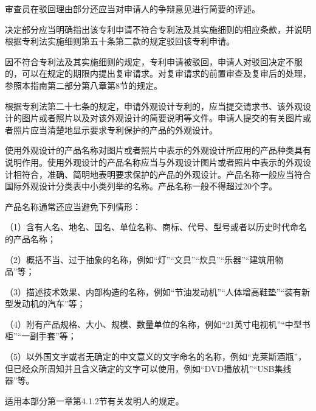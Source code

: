 审查员在驳回理由部分还应当对申请人的争辩意见进行简要的评述。

决定部分应当明确指出该专利申请不符合专利法及其实施细则的相应条款，并说明根据专利法实施细则第五十条第二款的规定驳回该专利申请。

因不符合专利法及其实施细则的规定，专利申请被驳回，申请人对驳回决定不服的，可以在规定的期限内提出复审请求。对复审请求的前置审查及复审后的处理，参照本指南第二部分第八章第8节的规定。

根据专利法第二十七条的规定，申请外观设计专利的，应当提交请求书、该外观设计的图片或者照片以及对该外观设计的简要说明等文件。申请人提交的有关图片或者照片应当清楚地显示要求专利保护的产品的外观设计。

使用外观设计的产品名称对图片或者照片中表示的外观设计所应用的产品种类具有说明作用。使用外观设计的产品名称应当与外观设计图片或者照片中表示的外观设计相符合，准确、简明地表明要求保护的产品的外观设计。产品名称一般应当符合国际外观设计分类表中小类列举的名称。产品名称一般不得超过20个字。

产品名称通常还应当避免下列情形：

{\setlength{\parindent}{17.1bp}（1）含有人名、地名、国名、单位名称、商标、代号、型号或者以历史时代命名的产品名称；\par}

{\setlength{\parindent}{17.1bp}（2）概括不当、过于抽象的名称，例如“灯”“文具”“炊具”“乐器”“建筑用物品”等；\par}

{\setlength{\parindent}{17.1bp}（3）描述技术效果、内部构造的名称，例如“节油发动机”“人体增高鞋垫”“装有新型发动机的汽车”等；\par}

{\setlength{\parindent}{17.1bp}（4）附有产品规格、大小、规模、数量单位的名称，例如“21英寸电视机”“中型书柜”“一副手套”等；\par}

{\setlength{\parindent}{17.1bp}（5）以外国文字或者无确定的中文意义的文字命名的名称，例如“克莱斯酒瓶”，但已经众所周知并且含义确定的文字可以使用，例如“DVD播放机”“USB集线器”等。\par}

适用本部分第一章第4.1.2节有关发明人的规定。

